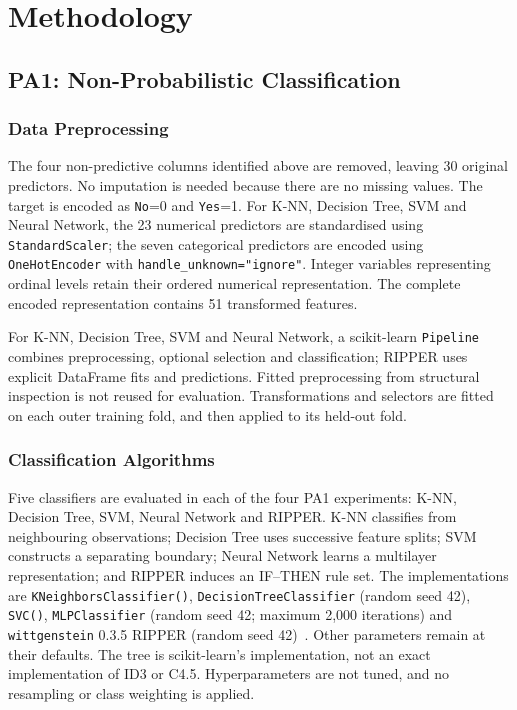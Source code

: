 \section{Methodology}
\subsection{PA1: Non-Probabilistic Classification}
\subsubsection{Data Preprocessing}
The four non-predictive columns identified above are removed, leaving 30 original predictors. No imputation is needed because there are no missing values. The target is encoded as \texttt{No}=0 and \texttt{Yes}=1. For K-NN, Decision Tree, SVM and Neural Network, the 23 numerical predictors are standardised using \texttt{StandardScaler}; the seven categorical predictors are encoded using \texttt{OneHotEncoder} with \texttt{handle\_unknown="ignore"}. Integer variables representing ordinal levels retain their ordered numerical representation. The complete encoded representation contains 51 transformed features.

For K-NN, Decision Tree, SVM and Neural Network, a scikit-learn \texttt{Pipeline}~\cite{sklearn} combines preprocessing, optional selection and classification; RIPPER uses explicit DataFrame fits and predictions. Fitted preprocessing from structural inspection is not reused for evaluation. Transformations and selectors are fitted on each outer training fold, and then applied to its held-out fold.

\subsubsection{Classification Algorithms}
Five classifiers are evaluated in each of the four PA1 experiments: K-NN, Decision Tree, SVM, Neural Network and RIPPER. K-NN classifies from neighbouring observations; Decision Tree uses successive feature splits; SVM constructs a separating boundary; Neural Network learns a multilayer representation; and RIPPER induces an IF--THEN rule set. The implementations are \texttt{KNeighborsClassifier()}, \texttt{DecisionTreeClassifier} (random seed 42), \texttt{SVC()}, \texttt{MLPClassifier} (random seed 42; maximum 2,000 iterations) and \texttt{wittgenstein} 0.3.5 RIPPER (random seed 42)~\cite{wittgenstein}. Other parameters remain at their defaults. The tree is scikit-learn's implementation, not an exact implementation of ID3 or C4.5. Hyperparameters are not tuned, and no resampling or class weighting is applied.


